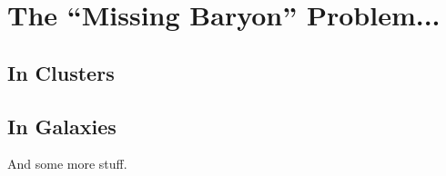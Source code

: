 

\afterpage{\clearpage}
\section{The ``Missing Baryon'' Problem...}
\label{s.Missing}
\subsection{In Clusters}
\label{s.Missing.Clusters}
\subsection{In Galaxies}
\label{s.Missing.Galaxies}
And some more stuff.\\
